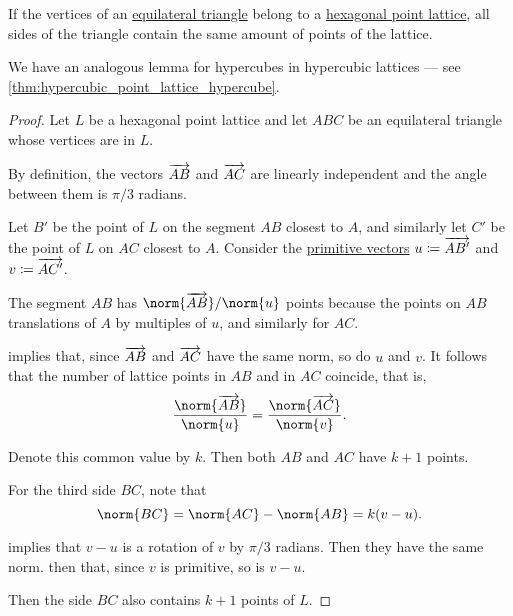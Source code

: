 \begin{lemma}\label{thm:hexagonal_point_lattice_equilateral_triangle}
  If the vertices of an \hyperref[def:triangle/equilateral]{equilateral triangle} belong to a \hyperref[def:hexagonal_point_lattice]{hexagonal point lattice}, all sides of the triangle contain the same amount of points of the lattice.
\end{lemma}
\begin{comments}
  \item We have an analogous lemma for hypercubes in hypercubic lattices --- see \cref{thm:hypercubic_point_lattice_hypercube}.
\end{comments}
\begin{proof}
  Let \( L \) be a hexagonal point lattice and let \( ABC \) be an equilateral triangle whose vertices are in \( L \).

  By definition, the vectors \( \overrightarrow{AB} \) and \( \overrightarrow{AC} \) are linearly independent and the angle between them is \( \pi / 3 \) radians.

  Let \( B' \) be the point of \( L \) on the segment \( AB \) closest to \( A \), and similarly let \( C' \) be the point of \( L \) on \( AC \) closest to \( A \). Consider the \hyperref[def:primitive_lattice_vector]{primitive vectors} \( u \coloneqq \overrightarrow{AB'} \) and \( v \coloneqq \overrightarrow{AC'} \).

  The segment \( AB \) has \( \norm{\vect{AB}} / \norm{u} \) points because the points on \( AB \) translations of \( A \) by multiples of \( u \), and similarly for \( AC \).

   implies that, since \( \overrightarrow{AB} \) and \( \overrightarrow{AC} \) have the same norm, so do \( u \) and \( v \). It follows that the number of lattice points in \( AB \) and in \( AC \) coincide, that is,
  \begin{equation*}
    \frac {\norm{\vect{AB}}} {\norm{u}} = \frac {\norm{\vect{AC}}} {\norm{v}}.
  \end{equation*}

  Denote this common value by \( k \). Then both \( AB \) and \( AC \) have \( k + 1 \) points.

  For the third side \( BC \), note that
  \begin{equation*}
    \norm{BC} = \norm{AC} - \norm{AB} = k(v - u).
  \end{equation*}

   implies that \( v - u \) is a rotation of \( v \) by \( \pi / 3 \) radians. Then they have the same norm.  then that, since \( v \) is primitive, so is \( v - u \).

  Then the side \( BC \) also contains \( k + 1 \) points of \( L \).
\end{proof}


